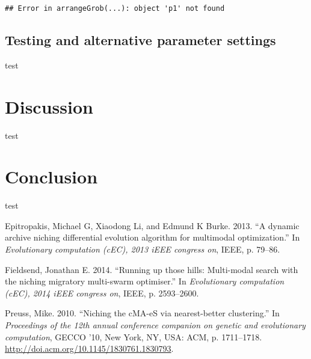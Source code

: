 \documentclass[12pt,a4paper]{article}
\begin{document}
\begin{verbatim}
## Error in arrangeGrob(...): object 'p1' not found
\end{verbatim}

\subsection{Testing and alternative parameter
settings}\label{testing-and-alternative-parameter-settings}

test

\section{Discussion}\label{discussion}

test

\section{Conclusion}\label{conclusion}

test \newpage

\hypertarget{refs}{}
\hypertarget{ref-epitropakisux5f2013}{}
Epitropakis, Michael G, Xiaodong Li, and Edmund K Burke. 2013. ``A
dynamic archive niching differential evolution algorithm for multimodal
optimization.'' In \emph{Evolutionary computation (cEC), 2013 iEEE
congress on}, IEEE, p. 79--86.

\hypertarget{ref-fieldsendux5f2014}{}
Fieldsend, Jonathan E. 2014. ``Running up those hills: Multi-modal
search with the niching migratory multi-swarm optimiser.'' In
\emph{Evolutionary computation (cEC), 2014 iEEE congress on}, IEEE, p.
2593--2600.

\hypertarget{ref-preussux5f2010}{}
Preuss, Mike. 2010. ``Niching the cMA-eS via nearest-better
clustering.'' In \emph{Proceedings of the 12th annual conference
companion on genetic and evolutionary computation}, GECCO '10, New York,
NY, USA: ACM, p. 1711--1718.
\url{http://doi.acm.org/10.1145/1830761.1830793}.
\end{document}
